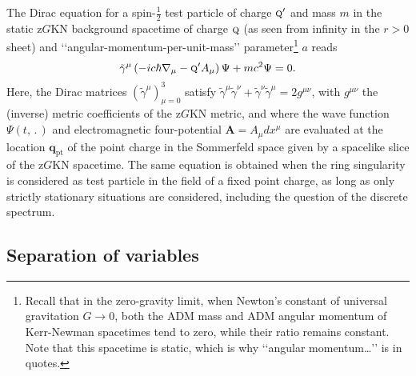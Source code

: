 \documentclass[11 pt]{article}
\renewcommand\({\left(}
\renewcommand\){\right)}
\newcommand\<{\langle}
\renewcommand\>{\rangle}
\newcommand\8{\infty}
\newcommand\beq{\begin{equation}}
\newcommand\eeq{\end{equation}}
\newcommand{\ga} {\gamma}\newcommand{\Ga}{\Gamma}
\newcommand{\bq}{\mathbf{q}}
\newcommand{\bA}{\mathbf{A}}
\begin{document}
The Dirac equation for a spin-$\frac12$ test particle of charge $\textsc{q}'$ and mass $m$ in the static z$G$KN background spacetime of charge $\textsc{q}$ (as seen from infinity in the $r>0$ sheet) and \lq\lq{}angular-momentum-per-unit-mass\rq\rq{} parameter\footnote{Recall that in the zero-gravity limit, when Newton\rq{}s constant of universal gravitation $G \to 0$, both the ADM mass and ADM angular momentum of Kerr-Newman spacetimes tend to zero, while their ratio remains constant.  Note that this spacetime is static, which is why \lq\lq{}angular momentum\dots\rq\rq{} is in quotes.} $a$  reads
\beq\label{eq:DirEqA}
{\tilde\ga}^\mu 
\left(-ic\hbar \nabla_\mu  - \textsc{q}' A_\mu\right)\Psi + mc^2 \Psi = 0.
\eeq
Here, the Dirac matrices $({\tilde\ga^\mu})_{\mu=0}^3$ satisfy $\tilde{\ga}^\mu \tilde{\ga}^\nu + \tilde{\ga}^\nu\tilde{\ga}^\mu = 2 g^{\mu\nu}$, with $g^{\mu\nu}$ the (inverse) metric coefficients of the z$G$KN metric,
and where the wave function $\Psi(t,\,.\,)$ and electromagnetic four-potential $\bA = A_\mu dx^\mu$ are evaluated at the location  $\bq_{\mathrm{pt}}$
of the point charge in the Sommerfeld space given by a spacelike slice of the z$G$KN spacetime.
 The same equation is obtained when the ring singularity is considered as test particle in the field of a fixed point charge, as long as only 
strictly stationary situations are considered, including the question of the discrete spectrum.

\subsection{Separation of variables}\label{sepVAR}
\end{document}
